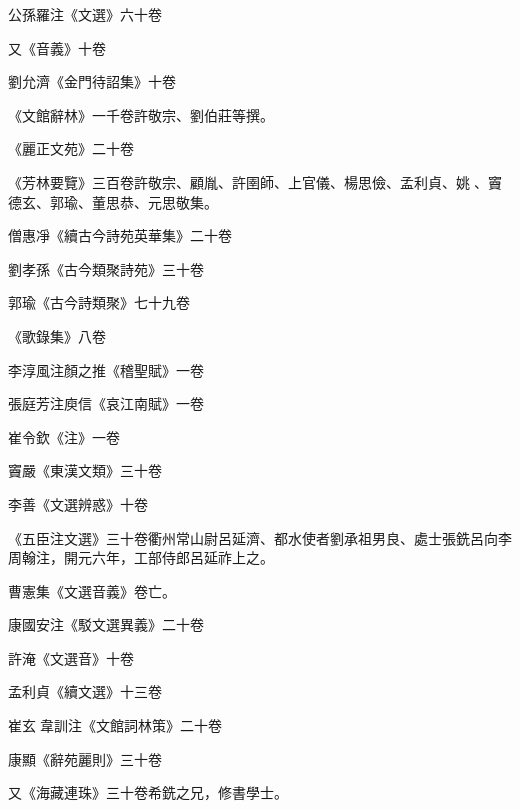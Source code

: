 \begin{pinyinscope}
 公孫羅注《文選》六十卷



 又《音義》十卷



 劉允濟《金門待詔集》十卷



 《文館辭林》一千卷許敬宗、劉伯莊等撰。



 《麗正文苑》二十卷



 《芳林要覽》三百卷許敬宗、顧胤、許圉師、上官儀、楊思儉、孟利貞、姚、竇德玄、郭瑜、董思恭、元思敬集。



 僧惠凈《續古今詩苑英華集》二十卷



 劉孝孫《古今類聚詩苑》三十卷



 郭瑜《古今詩類聚》七十九卷



 《歌錄集》八卷



 李淳風注顏之推《稽聖賦》一卷



 張庭芳注庾信《哀江南賦》一卷



 崔令欽《注》一卷



 竇嚴《東漢文類》三十卷



 李善《文選辨惑》十卷



 《五臣注文選》三十卷衢州常山尉呂延濟、都水使者劉承祖男良、處士張銑呂向李周翰注，開元六年，工部侍郎呂延祚上之。



 曹憲集《文選音義》卷亡。



 康國安注《駁文選異義》二十卷



 許淹《文選音》十卷



 孟利貞《續文選》十三卷



 崔玄韋訓注《文館詞林策》二十卷



 康顯《辭苑麗則》三十卷



 又《海藏連珠》三十卷希銑之兄，修書學士。




\end{pinyinscope}
